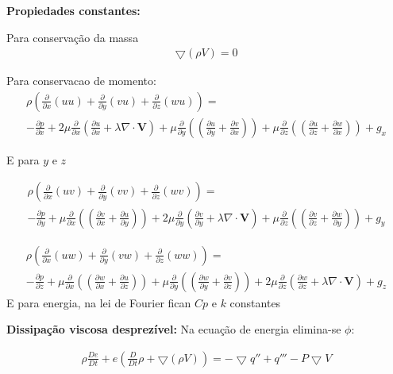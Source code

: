 \documentclass[]{article}
\begin{document}
\textbf{Propiedades constantes:}

Para conservação da massa
\begin{equation}
	\begin{aligned}
		\bigtriangledown (\rho V)= 0 
	\end{aligned}
\end{equation}

Para conservacao de momento:
\begin{equation}
	\begin{aligned}
		\rho(\frac{\partial}{\partial x} ( u u) + \frac{\partial}{\partial y} (v u) + \frac{\partial}{\partial z} (w u) )= \\
		- \frac{\partial p}{\partial x} +2 \mu \frac{\partial}{\partial x} \left(  \frac{\partial u}{\partial x} + \lambda \nabla \cdot \mathbf{V} \right) + \mu
		\frac{\partial}{\partial y} \left(  \left( \frac{\partial u}{\partial y} + \frac{\partial v}{\partial x} \right) \right) + \mu
		\frac{\partial}{\partial z} \left(  \left( \frac{\partial u}{\partial z} + \frac{\partial w}{\partial x} \right) \right) + g_x
	\end{aligned}
\end{equation}

E para $y$ e $z$

\begin{equation}
	\begin{aligned}
		\rho(\frac{\partial}{\partial x} ( u v) + \frac{\partial}{\partial y} ( v v) + \frac{\partial}{\partial z} ( w v)) = \\
		- \frac{\partial p}{\partial y} + \mu \frac{\partial}{\partial x} \left(  \left( \frac{\partial v}{\partial x} + \frac{\partial u}{\partial y} \right) \right) + 2 \mu
		\frac{\partial}{\partial y} \left(  \frac{\partial v}{\partial y} + \lambda \nabla \cdot \mathbf{V} \right) +\mu
		\frac{\partial}{\partial z} \left(  \left( \frac{\partial v}{\partial z} + \frac{\partial w}{\partial y} \right) \right) +  g_y
	\end{aligned}
\end{equation}

\begin{equation}
	\begin{aligned}
		\rho(\frac{\partial}{\partial x} ( u w) + \frac{\partial}{\partial y} ( v w) + \frac{\partial}{\partial z} ( w w)) = \\
		- \frac{\partial p}{\partial z} + \mu \frac{\partial}{\partial x} \left(  \left( \frac{\partial w}{\partial x} + \frac{\partial u}{\partial z} \right) \right) + \mu
		\frac{\partial}{\partial y} \left(  \left( \frac{\partial w}{\partial y} + \frac{\partial v}{\partial z} \right) \right) + 2 \mu
		\frac{\partial}{\partial z} \left(  \frac{\partial w}{\partial z} + \lambda \nabla \cdot \mathbf{V} \right) +  g_z
	\end{aligned}
\end{equation}
E para energia, na lei de Fourier fican $Cp$ e $k$ constantes

\textbf{Dissipação viscosa desprezível:}
Na ecuação de energia elimina-se $\phi$:

\begin{equation}
	\begin{aligned}
		\rho \frac{ De}{Dt} + e(\frac{D}{D t} \rho +  \bigtriangledown (\rho V)) = -\bigtriangledown q'' + q''' - P\bigtriangledown V 
	\end{aligned}
\end{equation}
\end{document}
